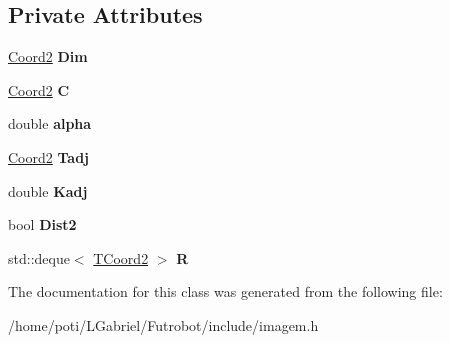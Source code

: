 \subsection*{Private Attributes}
\begin{DoxyCompactItemize}
\item 
\hyperlink{structCoord2}{Coord2} {\bfseries Dim}\hypertarget{classDistRadial_af4f1401e1e142553306199cb370f2264}{}\label{classDistRadial_af4f1401e1e142553306199cb370f2264}

\item 
\hyperlink{structCoord2}{Coord2} {\bfseries C}\hypertarget{classDistRadial_af4df6614c41311f797d3662b5123c19c}{}\label{classDistRadial_af4df6614c41311f797d3662b5123c19c}

\item 
double {\bfseries alpha}\hypertarget{classDistRadial_a1dfb1665ee0ce01d4cea04cfee361e58}{}\label{classDistRadial_a1dfb1665ee0ce01d4cea04cfee361e58}

\item 
\hyperlink{structCoord2}{Coord2} {\bfseries Tadj}\hypertarget{classDistRadial_aa780159b93fc7b14482987f8cdff21ba}{}\label{classDistRadial_aa780159b93fc7b14482987f8cdff21ba}

\item 
double {\bfseries Kadj}\hypertarget{classDistRadial_aebf712ce72b5b030379a83fc1c547564}{}\label{classDistRadial_aebf712ce72b5b030379a83fc1c547564}

\item 
bool {\bfseries Dist2}\hypertarget{classDistRadial_aeedf08063c206d5b3981d3324476b468}{}\label{classDistRadial_aeedf08063c206d5b3981d3324476b468}

\item 
std\+::deque$<$ \hyperlink{structTCoord2}{T\+Coord2} $>$ {\bfseries R}\hypertarget{classDistRadial_a21e998253c314814aa5e0cf0dc3b1346}{}\label{classDistRadial_a21e998253c314814aa5e0cf0dc3b1346}

\end{DoxyCompactItemize}


The documentation for this class was generated from the following file\+:\begin{DoxyCompactItemize}
\item 
/home/poti/\+L\+Gabriel/\+Futrobot/include/imagem.\+h\end{DoxyCompactItemize}
